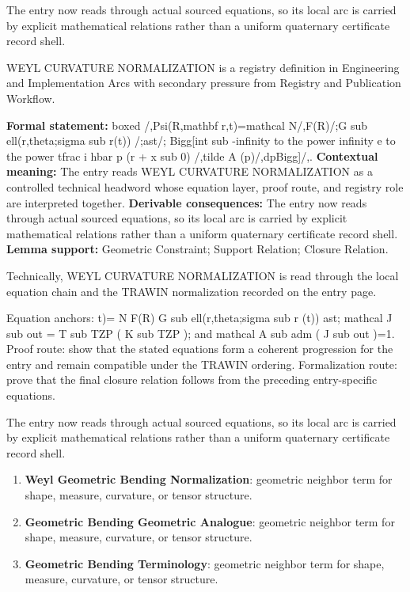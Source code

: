 The entry now reads through actual sourced equations, so its local arc is carried by explicit mathematical relations rather than a uniform quaternary certificate record shell.
\clearpage


\begingroup\small
{}
WEYL CURVATURE NORMALIZATION is a registry definition in Engineering and Implementation Arcs with secondary pressure from Registry and Publication Workflow.

\begingroup\footnotesize\setlength{\emergencystretch}{3em}\sloppy
\textbf{Formal statement:} boxed /,Psi(R,mathbf r,t)=mathcal N/,F(R)/;G sub ell(r,theta;sigma sub r(t)) /;ast/; Bigg[int sub -infinity to the power infinity e to the power tfrac i hbar p (r + x sub 0) /,tilde A (p)/,dpBigg]/,. \textbf{Contextual meaning:} The entry reads WEYL CURVATURE NORMALIZATION as a controlled technical headword whose equation layer, proof route, and registry role are interpreted together. \textbf{Derivable consequences:} The entry now reads through actual sourced equations, so its local arc is carried by explicit mathematical relations rather than a uniform quaternary certificate record shell. \textbf{Lemma support:} Geometric Constraint; Support Relation; Closure Relation.\par
\endgroup

Technically, WEYL CURVATURE NORMALIZATION is read through the local equation chain and the TRAWIN normalization recorded on the entry page.

Equation anchors: t)= N F(R) G sub ell(r,theta;sigma sub r (t)) ast; mathcal J sub out = T sub TZP ( K sub TZP ); and mathcal A sub adm ( J sub out )=1. Proof route: show that the stated equations form a coherent progression for the entry and remain compatible under the TRAWIN ordering. Formalization route: prove that the final closure relation follows from the preceding entry-specific equations.

The entry now reads through actual sourced equations, so its local arc is carried by explicit mathematical relations rather than a uniform quaternary certificate record shell.
\endgroup

\begin{enumerate}[leftmargin=1.6em,itemsep=6pt,topsep=4pt]
\item \textbf{Weyl Geometric Bending Normalization}: geometric neighbor term for shape, measure, curvature, or tensor structure.
\item \textbf{Geometric Bending Geometric Analogue}: geometric neighbor term for shape, measure, curvature, or tensor structure.
\item \textbf{Geometric Bending Terminology}: geometric neighbor term for shape, measure, curvature, or tensor structure.
\end{enumerate}

